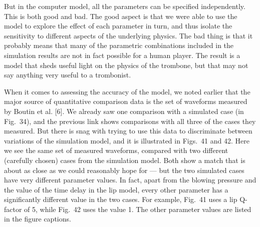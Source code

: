   But in the computer model, all the parameters can be specified independently. 
  This is both good and bad. The good aspect is that we were able to use the 
  model to explore the effect of each parameter in turn, and thus isolate the 
  sensitivity to different aspects of the underlying physics. The bad thing is 
  that it probably means that many of the parametric combinations included in 
  the simulation results are not in fact possible for a human player. The 
  result is a model that sheds useful light on the physics of the trombone, but 
  that may not say anything very useful to a trombonist. 

  When it comes to assessing the accuracy of the model, we noted earlier that 
  the major source of quantitative comparison data is the set of waveforms 
  measured by Boutin et al. [6]. We already saw one comparison with a simulated 
  case (in Fig.\ 34), and the previous link shows comparisons with all three of 
  the cases they measured. But there is snag with trying to use this data to 
  discriminate between variations of the simulation model, and it is 
  illustrated in Figs.\ 41 and 42. Here we see the same set of measured 
  waveforms, compared with two different (carefully chosen) cases from the 
  simulation model. Both show a match that is about as close as we could 
  reasonably hope for — but the two simulated cases have very different 
  parameter values. In fact, apart from the blowing pressure and the value of 
  the time delay in the lip model, every other parameter has a significantly 
  different value in the two cases. For example, Fig.\ 41 uses a lip Q-factor 
  of 5, while Fig.\ 42 uses the value 1. The other parameter values are listed 
  in the figure captions. 


